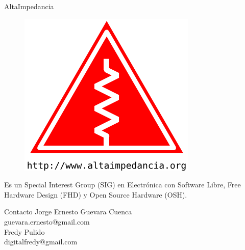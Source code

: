 \documentclass{beamer}
\begin{document}
\begin{frame}{AltaImpedancia}
  \begin{figure}
    \includegraphics{img/altaimpedancia-acerca-de}
  \end{figure}
  \begin{block}{}
    Es un Special Interest Group (SIG) en Electrónica con Software Libre, Free Hardware Design (FHD) y Open Source Hardware (OSH).
  \end{block}
  \begin{block}{Contacto}
    \centering
    Jorge Ernesto Guevara Cuenca\\guevara.ernesto@gmail.com\\
    Fredy Pulido\\digitalfredy@gmail.com
  \end{block}
\end{frame}
\end{document}

